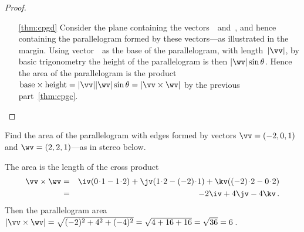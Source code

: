 \begin{proof}
\begin{enumerate}
\item[\ref{thm:cpgd}] Consider the plane containing the vectors~\vv\ and~\wv, 
%
and hence containing the parallelogram formed by these vectors---as illustrated in the margin.
Using vector~\vv\ as the base of the parallelogram, with length~\(|\vv|\), by basic trigonometry the height of the parallelogram is then \(|\wv|\sin\theta\).
Hence the area of the parallelogram is the product 
\(\text{base}\times\text{height}=|\vv||\wv|\sin\theta=|\vv\times\wv|\) by the previous part~\ref{thm:cpgc}.

\end{enumerate}
\end{proof}


\begin{example} \label{eg:apvw}
Find the area of the parallelogram with edges formed by vectors
\(\vv=(-2,0,1)\) and \(\wv=(2,2,1)\)---as in stereo below.
\begin{center}
\end{center}
\begin{solution} 
The area is the length of the cross product
\begin{eqnarray*}
\vv\times\wv
&=&\iv(0\cdot 1-1\cdot 2)
+\jv(1\cdot 2-(-2)\cdot 1)
+\kv((-2)\cdot 2-0\cdot 2)
\\&=&-2\iv+4\jv-4\kv\,.
\end{eqnarray*}
Then the parallelogram area \(|\vv\times\wv|=\sqrt{(-2)^2+4^2+(-4)^2}
=\sqrt{4+16+16}=\sqrt{36}=6\)\,.
\end{solution}
\end{example}



